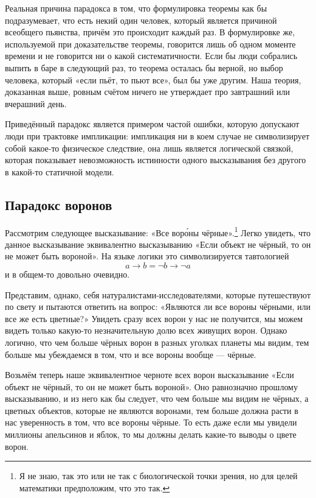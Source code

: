 Реальная причина парадокса в том, что формулировка теоремы как бы подразумевает, что есть некий один человек, который является причиной всеобщего пьянства, причём это происходит каждый раз. В формулировке же, используемой при доказательстве теоремы, говорится лишь об одном моменте времени и не говорится ни о какой систематичности. Если бы люди собрались выпить в баре в следующий раз, то теорема осталась бы верной, но выбор человека, который «если пьёт, то пьют все», был бы уже другим. Наша теория, доказанная выше, ровным счётом ничего не утверждает про завтрашний или вчерашний день.

Приведённый парадокс является примером частой ошибки, которую допускают люди при трактовке импликации: импликация ни в коем случае не символизирует собой  какое-то физическое следствие, она лишь является логической связкой, которая показывает невозможность истинности одного высказывания без другого в какой-то статичной модели.

\subsection{Парадокс воронов}

Рассмотрим следующее высказывание: «Все вор\'{о}ны чёрные».\footnote{Я не знаю, так это или не так с биологической точки зрения, но для целей математики предположим, что это так.} Легко увидеть, что данное высказывание эквивалентно высказыванию «Если объект не чёрный, то он не может быть вороной». На языке логики это символизируется тавтологией $$a \rightarrow b = \neg b \rightarrow \neg a$$ и в общем-то довольно очевидно.

Представим, однако, себя натуралистами-исследователями, которые путешествуют по свету и пытаются ответить на вопрос: «Являются ли все вороны чёрными, или все же есть цветные?» Увидеть сразу всех ворон у нас не получится, мы можем видеть только какую-то незначительную долю всех живущих ворон. Однако логично, что чем больше чёрных ворон в разных уголках планеты мы видим, тем больше мы убеждаемся в том, что и все вороны вообще — чёрные.

Возьмём теперь наше эквивалентное черноте всех ворон высказывание «Если объект не чёрный, то он не может быть вороной». Оно равнозначно прошлому высказыванию, и из него как бы следует, что чем больше мы видим не чёрных, а цветных объектов, которые не являются воронами, тем больше должна расти в нас уверенность в том, что все вороны чёрные. То есть даже если мы увидели миллионы апельсинов и яблок, то мы должны делать какие-то выводы о цвете ворон.

